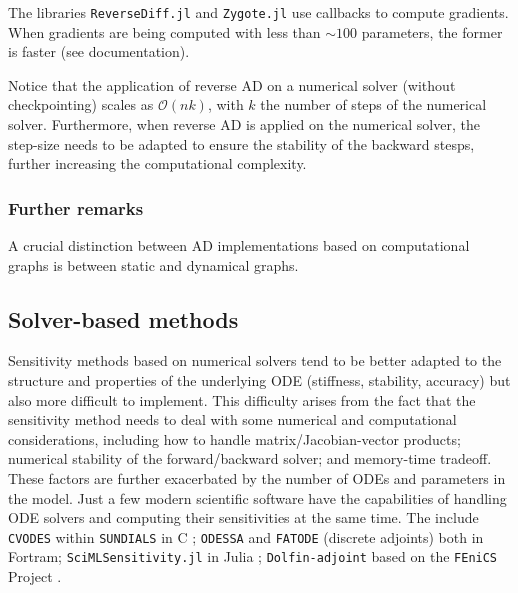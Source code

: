 
The libraries \texttt{ReverseDiff.jl} and \texttt{Zygote.jl} use callbacks to compute gradients. 
When gradients are being computed with less than $\sim 100$ parameters, the former is faster (see documentation).

\cite{Baydin_Pearlmutter_Radul_Siskind_2015}

Notice that the application of reverse AD on a numerical solver (without checkpointing) scales as $\mathcal O (n k)$, with $k$ the number of steps of the numerical solver. 
Furthermore, when reverse AD is applied on the numerical solver, the step-size needs to be adapted to ensure the stability of the backward stesps, further increasing the computational complexity. 

\subsubsection{Further remarks}

A crucial distinction between AD implementations based on computational graphs is between static and dynamical graphs\cite{Baydin_Pearlmutter_Radul_Siskind_2015}. 

\subsection{Solver-based methods}

Sensitivity methods based on numerical solvers tend to be better adapted to the structure and properties of the underlying ODE (stiffness, stability, accuracy) but also more difficult to implement.  
This difficulty arises from the fact that the sensitivity method needs to deal with some numerical and computational considerations, including how to handle matrix/Jacobian-vector products; numerical stability of the forward/backward solver; and memory-time tradeoff. 
These factors are further exacerbated by the number of ODEs and parameters in the model. 
Just a few modern scientific software have the capabilities of handling ODE solvers and computing their sensitivities at the same time. 
The include \texttt{CVODES} within \texttt{SUNDIALS} in C \cite{serban2005cvodes, SUNDIALS-hindmarsh2005sundials}; \texttt{ODESSA} \cite{ODESSA} and \texttt{FATODE} (discrete adjoints) \cite{FATODE2014} both in Fortram; \texttt{SciMLSensitivity.jl} in Julia \cite{rackauckas2020universal}; \texttt{Dolfin-adjoint} based on the \texttt{FEniCS} Project \cite{dolfin2013, dolfin2018}. 

